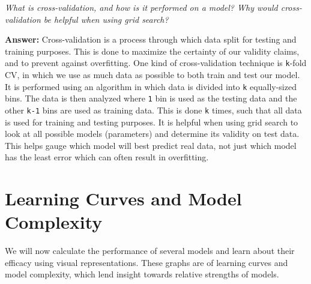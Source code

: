 \documentclass{article}
\begin{document}
\emph{What is cross-validation, and how is it performed on a model? Why
would cross-validation be helpful when using grid search?}

    \textbf{Answer: } Cross-validation is a process through which data split
for testing and training purposes. This is done to maximize the
certainty of our validity claims, and to prevent against overfitting.
One kind of cross-validation technique is \texttt{k}-fold CV, in which
we use as much data as possible to both train and test our model. It is
performed using an algorithm in which data is divided into \texttt{k}
equally-sized bins. The data is then analyzed where \texttt{1} bin is
used as the testing data and the other \texttt{k-1} bins are used as
training data. This is done \texttt{k} times, such that all data is used
for training and testing purposes. It is helpful when using grid search
to look at all possible models (parameters) and determine its validity
on test data. This helps gauge which model will best predict real data,
not just which model has the least error which can often result in
overfitting.

    \section{Learning Curves and Model
Complexity}\label{learning-curves-and-model-complexity}

We will now calculate the performance of several models and learn about
their efficacy using visual representations. These graphs are of
learning curves and model complexity, which lend insight towards
relative strengths of models.
\end{document}

